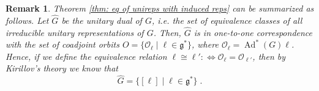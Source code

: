 \documentclass[pdflatex,sn-mathphys-num]{sn-jnl}
\theoremstyle{thmstyletwo}
\theoremstyle{thmstyleone}
\theoremstyle{thmstyletwo}
\newtheorem{remark}[definition]{Remark}
\newcommand{\fancyh}{\mathfrak{h}}
\newcommand{\fancyg}{\mathfrak{g}}
\newcommand{\coadjoint}{\operatorname{Ad}^*}
\newcommand{\C}{\mathbb{C}}
\begin{document}
	\begin{remark}\label{rem: characterization of dual}
		Theorem \ref{thm: eq of unireps with induced reps} can be summarized as follows.
		Let $\hat{G}$ be the unitary dual of $G$, i.e. the set of equivalence classes of all irreducible unitary representations of $G$. Then, $\hat{G}$ is in one-to-one correspondence with the set of coadjoint orbits $O = \{\mathcal{O}_\ell \;|\; \ell \in \fancyg^*\}$, where $\mathcal{O}_\ell = \coadjoint (G)\ell$. Hence, if we define the equivalence relation $\ell \cong \ell' :\iff \mathcal{O}_\ell = \mathcal{O}_{\ell'}$, then by Kirillov's theory we know that
		\[\hat{G} = \{[\ell] \;|\; \ell \in \fancyg^*\} \;.\]
	\end{remark}
	
\end{document}
